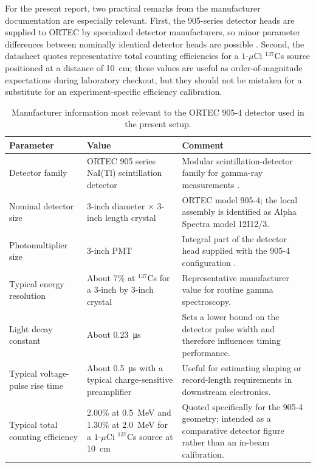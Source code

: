 For the present report, two practical remarks from the manufacturer documentation are especially relevant. First, the 905-series detector heads are supplied to ORTEC by specialized detector manufacturers, so minor parameter differences between nominally identical detector heads are possible \citep{ORTEC905SeriesManual}. Second, the datasheet quotes representative total counting efficiencies for a $1$-$\mu$Ci $^{137}$Cs source positioned at a distance of \SI{10}{cm}; these values are useful as order-of-magnitude expectations during laboratory checkout, but they should not be mistaken for a substitute for an experiment-specific efficiency calibration.

\begin{table}[htbp]
\centering
\caption{Manufacturer information most relevant to the ORTEC 905-4 detector used in the present setup.}
\label{tab:ortec9054-specs}
\small
\setlength{\tabcolsep}{5pt}
\renewcommand{\arraystretch}{1.08}
\begin{tabularx}{\textwidth}{>{\raggedright\arraybackslash}p{4.2cm}YY}
\toprule
Parameter & Value & Comment \\
\midrule
Detector family & ORTEC 905 series NaI(Tl) scintillation detector & Modular scintillation-detector family for gamma-ray measurements \citep{ORTEC905SeriesManual}. \\
Nominal detector size & 3-inch diameter $\times$ 3-inch length crystal & ORTEC model 905-4; the local assembly is identified as Alpha Spectra model 12I12/3. \\
Photomultiplier size & 3-inch PMT & Integral part of the detector head supplied with the 905-4 configuration \citep{ORTEC905SeriesManual}. \\
Typical energy resolution & About 7\% at $^{137}$Cs for a 3-inch by 3-inch crystal & Representative manufacturer value for routine gamma spectroscopy. \\
Light decay constant & About \SI{0.23}{\micro\second} & Sets a lower bound on the detector pulse width and therefore influences timing performance. \\
Typical voltage-pulse rise time & About \SI{0.5}{\micro\second} with a typical charge-sensitive preamplifier & Useful for estimating shaping or record-length requirements in downstream electronics. \\
Typical total counting efficiency & 2.00\% at \SI{0.5}{MeV} and 1.30\% at \SI{2.0}{MeV} for a $1$-$\mu$Ci $^{137}$Cs source at \SI{10}{cm} & Quoted specifically for the 905-4 geometry; intended as a comparative detector figure rather than an in-beam calibration. \\
\bottomrule
\end{tabularx}
\end{table}

